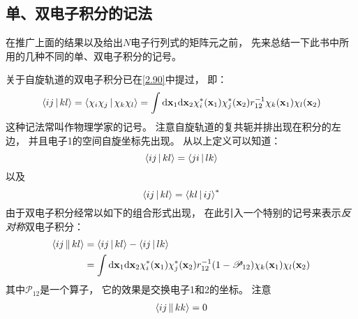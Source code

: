 
\subsection{单、双电子积分的记法}
\label{sec2.3.2}
在推广上面的结果以及给出$N$电子行列式的矩阵元之前，
先来总结一下此书中所用的几种不同的单、双电子积分的记号。

关于自旋轨道的双电子积分已在\eqref{2.90}中提过，
即：
\begin{equation}
\braket{ij|kl}=\braket{\chi_i\chi_j|\chi_k\chi_l}=\int\dd\mathbf{x}_1\dd\mathbf{x}_2\chi_i^*(\mathbf{x}_1)\chi_j^*(\mathbf{x}_2)r_{12}^{-1}\chi_k(\mathbf{x}_1)\chi_l(\mathbf{x}_2)
\end{equation}
这种记法常叫作物理学家的记号。
注意自旋轨道的复共轭并排出现在积分的左边，
并且电子1的空间自旋坐标先出现。
从以上定义可以知道：
\begin{equation}
\Braket{ij|kl}=\Braket{ji|lk}
\end{equation}
以及
\begin{equation}
\Braket{ij|kl}=\Braket{kl|ij}^*
\end{equation}
由于双电子积分经常以如下的组合形式出现，
在此引入一个特别的记号来表示\emph{反对称}双电子积分：
\begin{align}
\braket{ij||kl}&=\braket{ij|kl} - \braket{ij|lk}\notag\\
&=\int\dd\bo{x}_1\dd\bo{x}_2\chi_i^*(\bo{x}_1)\chi_j^*(\bo{x}_2)r_{12}^{-1}(1-\mathscr{P}_{12})\chi_k(\bo{x}_1)\chi_l(\bo{x}_2)
\end{align}
其中$\mathscr{P}_{12}$是一个算子，
它的效果是交换电子1和2的坐标。
注意
\begin{align}
\Braket{ij||kk}=0
\label{2.97}
\end{align}

